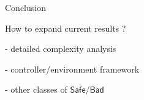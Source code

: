 \documentclass{beamer}
\newcommand{\Bad}{\textsf{Bad}}
\newcommand{\Safe}{\textsf{Safe}}
\begin{document}
  \begin{frame}{Conclusion}
  

How to expand current results ?

- detailed complexity analysis

- controller/environment framework

- other classes of $\Safe / \Bad$


      
  \end{frame}

 
  
\end{document}
